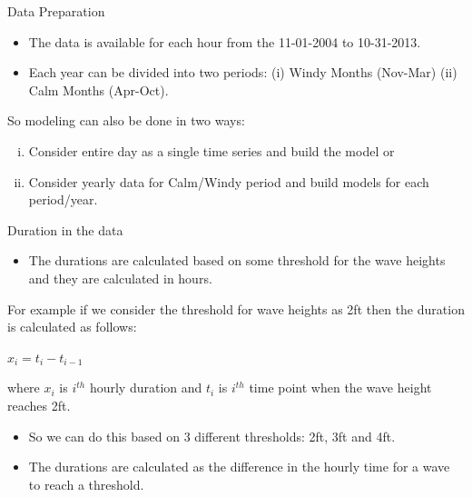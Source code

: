 \documentclass[
  ignorenonframetext,
]{beamer}
\providecommand{\tightlist}{%
  \setlength{\itemsep}{0pt}\setlength{\parskip}{0pt}}
\begin{document}
\begin{frame}{Data Preparation}
\protect\hypertarget{data-preparation}{}
\begin{itemize}
\item
  The data is available for each hour from the 11-01-2004 to 10-31-2013.
\item
  Each year can be divided into two periods: (i) Windy Months (Nov-Mar)
  (ii) Calm Months (Apr-Oct).
\end{itemize}

So modeling can also be done in two ways:

\begin{enumerate}
[(i)]
\item
  Consider entire day as a single time series and build the model or
\item
  Consider yearly data for Calm/Windy period and build models for each
  period/year.
\end{enumerate}
\end{frame}

\begin{frame}{Duration in the data}
\protect\hypertarget{duration-in-the-data}{}
\begin{itemize}
\tightlist
\item
  The durations are calculated based on some threshold for the wave
  heights and they are calculated in hours.
\end{itemize}

For example if we consider the threshold for wave heights as 2ft then
the duration is calculated as follows:

\(x_i = t_i - t_{i-1}\)

where \(x_i\) is \(i^{th}\) hourly duration and \(t_i\) is \(i^{th}\)
time point when the wave height reaches 2ft.

\begin{itemize}
\item
  So we can do this based on 3 different thresholds: 2ft, 3ft and 4ft.
\item
  The durations are calculated as the difference in the hourly time for
  a wave to reach a threshold.
\end{itemize}
\end{frame}
\end{document}
